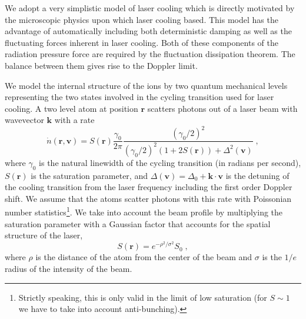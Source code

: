 \documentclass[aps, pra, preprint]{revtex4-1}
\begin{document}
We adopt a very simplistic model of laser cooling which is directly
motivated by the microscopic physics upon which laser cooling based.
This model has the advantage of automatically including both
deterministic damping as well as the fluctuating forces inherent in
laser cooling.  Both of these components of the radiation pressure force
are required by the fluctuation dissipation theorem.  The balance
between them gives rise to the Doppler limit.

We model the internal structure of the ions by two quantum mechanical
levels representing the two states involved in the cycling transition
used for laser cooling.  A two level atom at position $\mathbf{r}$
scatters photons out of a laser beam with wavevector $\mathbf{k}$ with a
rate
\begin{equation}
\dot n (\mathbf{r}, \mathbf{v}) = 
S(\mathbf{r})\frac{\gamma_0}{2\pi}
\frac{(\gamma_0/2)^2}{(\gamma_0/2)^2(1+2S(\mathbf{r}))+\Delta^2(\mathbf{v})}\;,
\end{equation}
where $\gamma_0$ is the natural linewidth of the cycling transition (in
radians per second), $S(\mathbf{r})$ is the saturation parameter, and
$\Delta(\mathbf{v})=\Delta_0 + \mathbf{k}\cdot\mathbf{v}$ is the
detuning of the cooling transition from the laser frequency including
the first order Doppler shift.  We assume that the atoms scatter photons
with this rate with Poissonian number statistics\footnote{Strictly
speaking, this is only valid in the limit of low saturation (for
$S\sim 1$ we have to take into account anti-bunching).}.  We take into
account the beam profile by multiplying the saturation parameter with a
Gaussian factor that accounts for the spatial structure of the laser,
\begin{equation}
S(\mathbf{r})=e^{-\rho^2/\sigma^2}S_0\;,
\end{equation}
where $\rho$ is the distance of the atom from the center of the beam and
$\sigma$ is the $1/e$ radius of the intensity of the beam.
\end{document}
